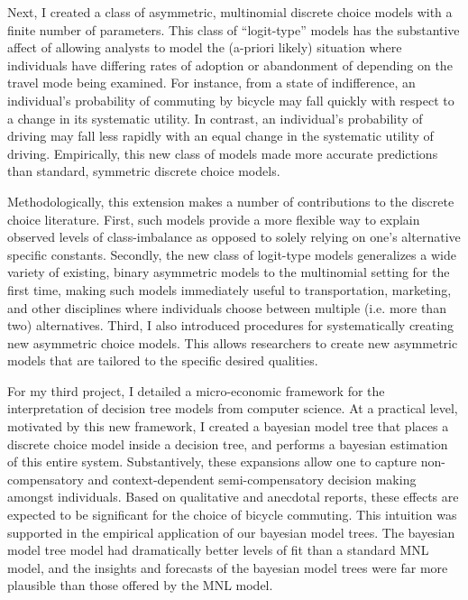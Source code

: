 \documentclass{article}
\begin{document}
Next, I created a class of asymmetric, multinomial discrete choice models with a finite number of parameters. This class of ``logit-type'' models has the substantive affect of allowing analysts to model the (a-priori likely) situation where individuals have differing rates of adoption or abandonment of depending on the travel mode being examined. For instance, from a state of indifference, an individual's probability of commuting by bicycle may fall quickly with respect to a change in its systematic utility. In contrast, an individual's probability of driving may fall less rapidly with an equal change in the systematic utility of driving. Empirically, this new class of models made more accurate predictions than standard, symmetric discrete choice models.

Methodologically, this extension makes a number of contributions to the discrete choice literature. First, such models provide a more flexible way to explain observed levels of class-imbalance as opposed to solely relying on one's alternative specific constants. Secondly, the new class of logit-type models generalizes a wide variety of existing, binary asymmetric models to the multinomial setting for the first time, making such models immediately useful to transportation, marketing, and other disciplines where individuals choose between multiple (i.e. more than two) alternatives. Third, I also introduced procedures for systematically creating new asymmetric choice models. This allows researchers to create new asymmetric models that are tailored to the specific desired qualities.

For my third project, I detailed a micro-economic framework for the interpretation of decision tree models from computer science. At a practical level, motivated by this new framework, I created a bayesian model tree that places a discrete choice model inside a decision tree, and performs a bayesian estimation of this entire system. Substantively, these expansions allow one to capture non-compensatory and context-dependent semi-compensatory decision making amongst individuals. Based on qualitative and anecdotal reports, these effects are expected to be significant for the choice of bicycle commuting. This intuition was supported in the empirical application of our bayesian model trees. The bayesian model tree model had dramatically better levels of fit than a standard MNL model, and the insights and forecasts of the bayesian model trees were far more plausible than those offered by the MNL model.
\end{document}
